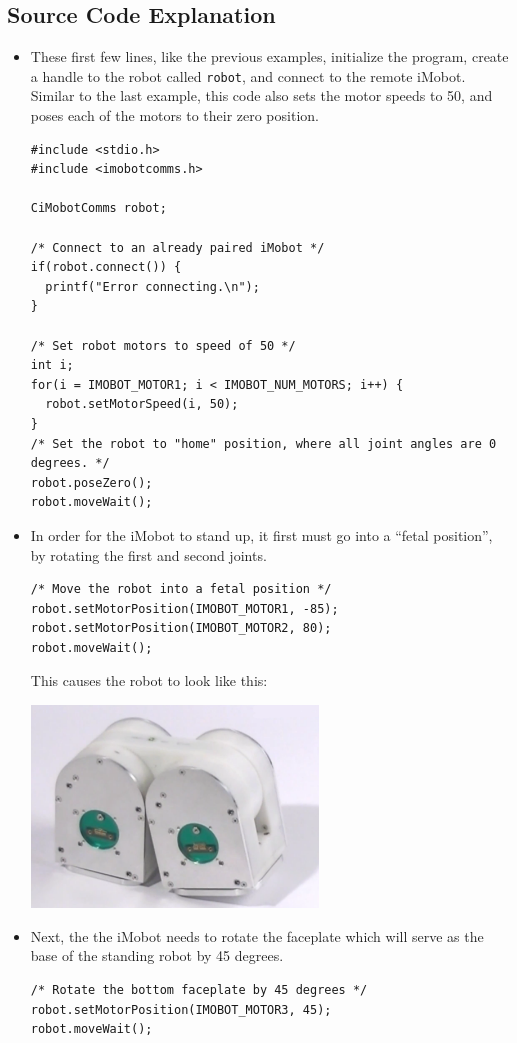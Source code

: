 \documentclass[11pt]{report}
\begin{document}
\subsection{Source Code Explanation}
\begin{itemize}
\item
These first few lines, like the previous examples, initialize the program,
create a handle to the robot called \texttt{robot}, and connect to the remote
iMobot. Similar to the last example, this code also sets the motor speeds to 50,
and poses each of the motors to their zero position.
\begin{verbatim}
#include <stdio.h>
#include <imobotcomms.h>

CiMobotComms robot;

/* Connect to an already paired iMobot */
if(robot.connect()) {
  printf("Error connecting.\n");
}

/* Set robot motors to speed of 50 */
int i;
for(i = IMOBOT_MOTOR1; i < IMOBOT_NUM_MOTORS; i++) {
  robot.setMotorSpeed(i, 50);
}
/* Set the robot to "home" position, where all joint angles are 0 degrees. */
robot.poseZero();
robot.moveWait();
\end{verbatim}

\item 
In order for the iMobot to stand up, it first must go into a ``fetal
position'', by rotating the first and second joints.
\begin{verbatim}
/* Move the robot into a fetal position */
robot.setMotorPosition(IMOBOT_MOTOR1, -85);
robot.setMotorPosition(IMOBOT_MOTOR2, 80);
robot.moveWait();
\end{verbatim}
This causes the robot to look like this:

\includegraphics[width=3in]{images/stand1.png}

\item
Next, the the iMobot needs to rotate the faceplate which will serve as the base
of the standing robot by 45 degrees.
\begin{verbatim}
/* Rotate the bottom faceplate by 45 degrees */
robot.setMotorPosition(IMOBOT_MOTOR3, 45);
robot.moveWait();
\end{verbatim}


\end{itemize}
\end{document}
